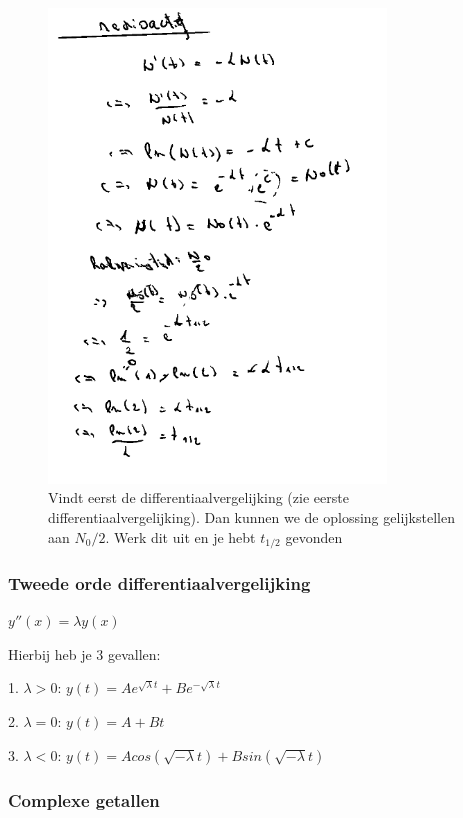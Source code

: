 \documentclass[a4paper]{report}
\begin{document}
\begin{figure}[H]
	\centering
	\includegraphics[width=0.8\textwidth]{assets/radio_solution.png}
	\caption{Vindt eerst de differentiaalvergelijking (zie eerste differentiaalvergelijking). Dan kunnen we de oplossing gelijkstellen aan $N_0 / 2$. Werk dit uit en je hebt $t_{1/2}$ gevonden}
	\label{fig:radio_solution}
\end{figure}

\subsubsection{Tweede orde differentiaalvergelijking}

$y''(x) = \lambda y(x)$

Hierbij heb je 3 gevallen:

1. $\lambda > 0$: $y(t) = A e^{\sqrt{\lambda} t} + B e^{-\sqrt{\lambda} t}$

2. $\lambda = 0$: $y(t) = A + Bt$

3. $\lambda < 0$: $y(t) = A cos(\sqrt{-\lambda} t) + B sin(\sqrt{-\lambda} t)$

\subsubsection{Complexe getallen}
\end{document}
